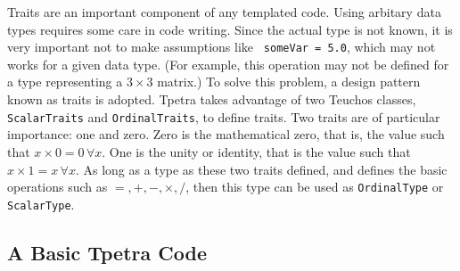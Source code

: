 Traits are an important component of any templated code.
Using arbitary data types requires some care in code writing. Since the actual
type is not known, it is very important not to make assumptions like {\tt
  someVar = 5.0}, which may not works for a given data type. 
  (For example, this operation may not be defined for a type representing a $3
   \times 3$ matrix.) To solve this problem, a design pattern known as traits
  is adopted. Tpetra takes advantage of two Teuchos classes, {\tt
    ScalarTraits} and {\tt OrdinalTraits}, to define traits. Two traits are of
    particular importance: one and zero. Zero is the mathematical zero, that
    is, the value such that $x \times 0 = 0 \, \forall x$. One is the unity or
    identity, that is the value such that $x \times 1 = x \, \forall x$. As
    long as a type as these two traits defined, and defines the basic
    operations such as $=, +, -, \times, /$, then this type can be used as
    {\tt OrdinalType} or {\tt ScalarType}.

\subsection{A Basic Tpetra Code}
\label{sec:tpetra_basic}

